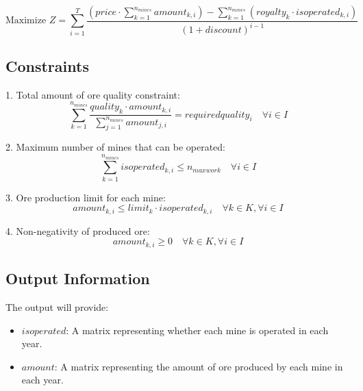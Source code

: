 \documentclass{article}
\begin{document}
\[
\text{Maximize } Z = \sum_{i=1}^{T} \frac{(price \cdot \sum_{k=1}^{n_{mines}} amount_{k,i}) - \sum_{k=1}^{n_{mines}} (royalty_k \cdot isoperated_{k,i})}{(1 + discount)^{i-1}}
\]

\subsection*{Constraints}

1. Total amount of ore quality constraint:
\[
\sum_{k=1}^{n_{mines}} \frac{quality_k \cdot amount_{k,i}}{\sum_{j=1}^{n_{mines}} amount_{j,i}} = requiredquality_i \quad \forall i \in I
\]

2. Maximum number of mines that can be operated:
\[
\sum_{k=1}^{n_{mines}} isoperated_{k,i} \leq n_{maxwork} \quad \forall i \in I
\]

3. Ore production limit for each mine:
\[
amount_{k,i} \leq limit_k \cdot isoperated_{k,i} \quad \forall k \in K, \forall i \in I
\]

4. Non-negativity of produced ore:
\[
amount_{k,i} \geq 0 \quad \forall k \in K, \forall i \in I
\]

\subsection*{Output Information}
The output will provide:
\begin{itemize}
    \item $isoperated$: A matrix representing whether each mine is operated in each year.
    \item $amount$: A matrix representing the amount of ore produced by each mine in each year.
\end{itemize}
\end{document}
